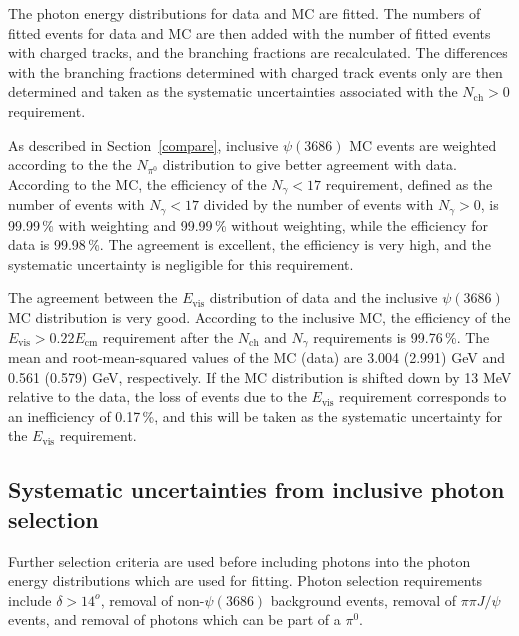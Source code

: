 \documentclass[aps,prd,twocolumn,showpacs,floatfix,byrevtex]{revtex4-1}
\begin{document}
The photon energy distributions for data and MC are fitted.  The
numbers of fitted events for data and MC are then added with the
number of fitted events with charged tracks, and the branching fractions
are recalculated.  The differences with the branching fractions
determined with charged track events only are then determined and
taken as the systematic uncertainties associated with the
$N_{\text{ch}} > 0$ requirement.

As described in Section~\ref{compare}, inclusive $\psi(3686)$ MC events
are weighted according to the the $N_{\pi^0}$ distribution to give
better agreement with data.  According to the MC, the
efficiency of the $N_{\gamma} < 17$ requirement, defined as the number
of events with $N_{\gamma} < 17$ divided by the number of events with
$N_{\gamma} >0$, is 99.99\,\% with weighting and 99.99\,\%
without weighting, while the efficiency for data is 99.98\,\%.  The
agreement is excellent, the efficiency is very high, and the
systematic uncertainty is negligible for this requirement.


The agreement between the $E_{\text{vis}}$ distribution of data and the
inclusive $\psi(3686)$ MC distribution is very good. 
According to the inclusive MC, the efficiency of the $E_{\text{vis}} >
0.22 E_{\text{cm}}$ requirement after the $N_{\text{ch}}$ and
$N_{\gamma}$ requirements is 99.76\,\%.  The mean and
root-mean-squared values of the MC (data) are 3.004 (2.991) GeV and
0.561 (0.579) GeV, respectively. If the MC distribution is shifted
down by 13 MeV relative to the data, the loss of events due to the
$E_{\text{vis}}$ requirement corresponds to an inefficiency of
0.17\,\%, and this will be taken as the systematic uncertainty for the
$E_{\text{vis}}$ requirement.


\subsection{\boldmath Systematic uncertainties from inclusive photon selection}

Further selection criteria are used before including photons into the
photon energy distributions which are used for fitting.  Photon selection
requirements include $\delta > 14^o$, removal of non-$\psi(3686)$ background
events, removal of $\pi \pi J/\psi$ events, and removal of photons which
can be part of a $\pi^0$. 
\end{document}
